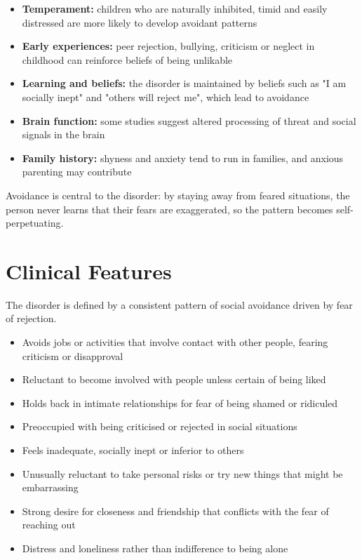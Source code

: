 \begin{itemize}
    \item \textbf{Temperament:} children who are naturally inhibited, timid and easily distressed are more likely to develop avoidant patterns
    \item \textbf{Early experiences:} peer rejection, bullying, criticism or neglect in childhood can reinforce beliefs of being unlikable
    \item \textbf{Learning and beliefs:} the disorder is maintained by beliefs such as "I am socially inept" and "others will reject me", which lead to avoidance
    \item \textbf{Brain function:} some studies suggest altered processing of threat and social signals in the brain
    \item \textbf{Family history:} shyness and anxiety tend to run in families, and anxious parenting may contribute
\end{itemize}

Avoidance is central to the disorder: by staying away from feared situations, the person never learns that their fears are exaggerated, so the pattern becomes self-perpetuating.

\section*{Clinical Features}
The disorder is defined by a consistent pattern of social avoidance driven by fear of rejection.

\begin{itemize}
    \item Avoids jobs or activities that involve contact with other people, fearing criticism or disapproval
    \item Reluctant to become involved with people unless certain of being liked
    \item Holds back in intimate relationships for fear of being shamed or ridiculed
    \item Preoccupied with being criticised or rejected in social situations
    \item Feels inadequate, socially inept or inferior to others
    \item Unusually reluctant to take personal risks or try new things that might be embarrassing
    \item Strong desire for closeness and friendship that conflicts with the fear of reaching out
    \item Distress and loneliness rather than indifference to being alone
\end{itemize}

